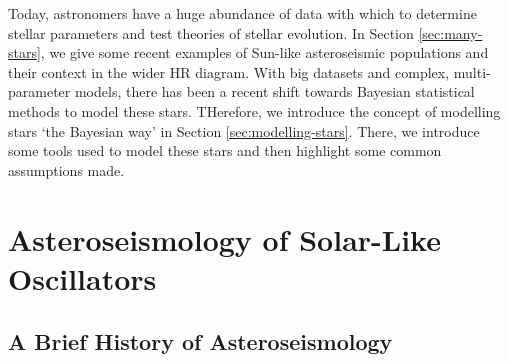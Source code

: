 Today, astronomers have a huge abundance of data with which to determine stellar parameters and test theories of stellar evolution. In Section \ref{sec:many-stars}, we give some recent examples of Sun-like asteroseismic populations and their context in the wider HR diagram. With big datasets and complex, multi-parameter models, there has been a recent shift towards Bayesian statistical methods to model these stars. THerefore, we introduce the concept of modelling stars `the Bayesian way' in Section \ref{sec:modelling-stars}. There, we introduce some tools used to model these stars and then highlight some common assumptions made.





\section[Solar-Like Oscillators]{Asteroseismology of Solar-Like Oscillators}\label{sec:seismo}


\subsection{A Brief History of Asteroseismology}

